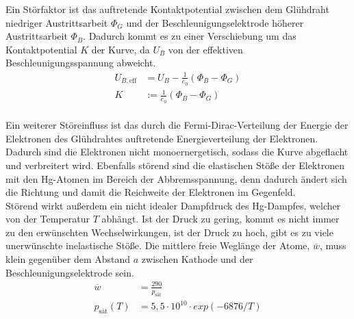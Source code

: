  Ein Störfaktor ist das auftretende Kontaktpotential zwischen dem Glühdraht niedriger Austrittsarbeit
$\Phi_G$ 
 und der Beschleunigungselektrode höherer Austrittsarbeit $\Phi_B$. 
 Dadurch kommt es zu einer Verschiebung um das Kontaktpotential $K$
 der Kurve, da $U_B$ von der effektiven Beschleunigungsspannung abweicht.
 \begin{align}
 U_{B, \text{eff}}&=U_B - \frac{1}{e_0} (\Phi_B - \Phi_G) \\
 K&:=\frac{1}{e_0}(\Phi_B - \Phi_G)
 \end{align}
\\
Ein weiterer Störeinfluss ist das durch die Fermi-Dirac-Verteilung der Energie der Elektronen des 
Glühdrahtes auftretende Energieverteilung der Elektronen. Dadurch sind die Elektronen nicht 
monoernergetisch, sodass die Kurve abgeflacht und verbreitert wird. Ebenfalls störend sind die 
elastischen Stöße der Elektronen mit den Hg-Atomen im Bereich der Abbremsspannung, denn dadurch ändert 
sich die Richtung und damit die Reichweite der Elektronen im Gegenfeld.\\
Störend wirkt außerdem ein nicht idealer Dampfdruck des Hg-Dampfes, welcher von der Temperatur $T$ abhängt.
Ist der Druck zu gering, kommt es
nicht immer zu den erwünschten Wechselwirkungen, ist der Druck zu hoch, gibt es zu viele unerwünschte 
inelastische Stöße. Die mittlere freie Weglänge der Atome, $\overline w$, muss klein gegenüber dem
Abstand $a$ zwischen Kathode und der Beschleunigungselektrode sein.
\begin{align}
\overline w &=\frac{290}{p_{\text{sät}}} \\
p_{\text{sät}}(T)&=5,5 \cdot 10^10 \cdot exp(-6876/T) 
\end{align} 

